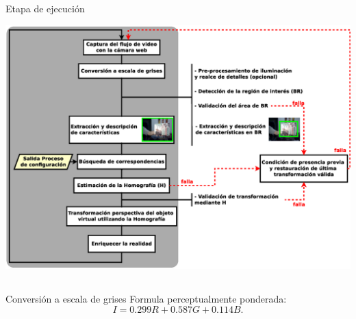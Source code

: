 %
\begin{frame}{Etapa de ejecución}
	\begin{center}
  	  \includegraphics[scale=0.29]{../../figs/proceso_completo_presentacion_negrita} %
	\end{center}
\end{frame}


\subsection*{}
\begin{frame}{Conversión a escala de grises}
	Formula perceptualmente ponderada:
	\begin{equation*}
	  \label{eq:formula_conv_grises}
	  I=0.299R+0.587G+0.114B.
	\end{equation*}
\end{frame}

